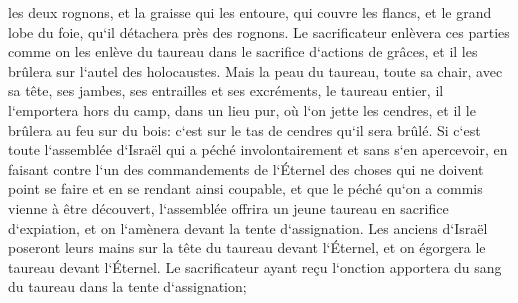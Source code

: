 \verse les deux rognons, et la graisse qui les entoure, qui couvre les flancs, et le grand lobe du foie, qu`il détachera près des rognons. 
\verse Le sacrificateur enlèvera ces parties comme on les enlève du taureau dans le sacrifice d`actions de grâces, et il les brûlera sur l`autel des holocaustes. 
\verse Mais la peau du taureau, toute sa chair, avec sa tête, ses jambes, ses entrailles et ses excréments, 
\verse le taureau entier, il l`emportera hors du camp, dans un lieu pur, où l`on jette les cendres, et il le brûlera au feu sur du bois: c`est sur le tas de cendres qu`il sera brûlé. 
\verse Si c`est toute l`assemblée d`Israël qui a péché involontairement et sans s`en apercevoir, en faisant contre l`un des commandements de l`Éternel des choses qui ne doivent point se faire et en se rendant ainsi coupable, 
\verse et que le péché qu`on a commis vienne à être découvert, l`assemblée offrira un jeune taureau en sacrifice d`expiation, et on l`amènera devant la tente d`assignation. 
\verse Les anciens d`Israël poseront leurs mains sur la tête du taureau devant l`Éternel, et on égorgera le taureau devant l`Éternel. 
\verse Le sacrificateur ayant reçu l`onction apportera du sang du taureau dans la tente d`assignation; 
